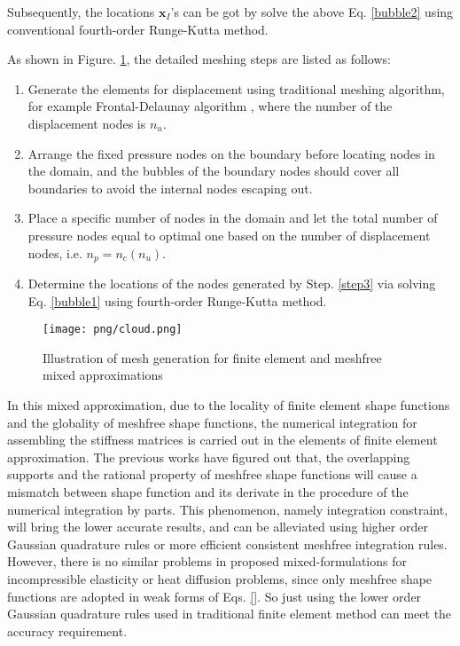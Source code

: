 Subsequently, the locations $\boldsymbol x_I$'s can be got by solve the above Eq. \eqref{bubble2} using conventional fourth-order Runge-Kutta method.

As shown in Figure. \ref{fig:cloud}, the detailed meshing steps are listed as follows: 
\begin{enumerate}
    \item Generate the elements for displacement using traditional meshing algorithm, for example Frontal-Delaunay algorithm , where the number of the displacement nodes is $n_u$. 
    \item Arrange the fixed pressure nodes on the boundary before locating nodes in the domain, and the bubbles of the boundary nodes should cover all boundaries to avoid the internal nodes escaping out.
    \item Place a specific number of nodes in the domain and let the total number of pressure nodes equal to optimal one based on the number of displacement nodes, i.e. $n_p = n_c(n_u)$. \label{step3}
    \item Determine the locations of the nodes generated by Step. \ref{step3} via solving Eq. \eqref{bubble1} using fourth-order Runge-Kutta method.
\end{enumerate}

\begin{figure}[!ht]
\centering
\texttt{[image: png/cloud.png]}
\caption{Illustration of mesh generation for finite element and meshfree mixed approximations}\label{fig:cloud}
\end{figure}

In this mixed approximation, due to the locality of finite element shape functions and the globality of meshfree shape functions, the numerical integration for assembling the stiffness matrices is carried out in the elements of finite element approximation. 
The previous works have figured out that, the overlapping supports and the rational property of meshfree shape functions will cause a mismatch between shape function and its derivate in the procedure of the numerical integration by parts. This phenomenon, namely integration constraint, will bring the lower accurate results, and can be alleviated using higher order Gaussian quadrature rules or more efficient consistent meshfree integration rules. 
However, there is no similar problems in proposed mixed-formulations for incompressible elasticity or heat diffusion problems, since only meshfree shape functions are adopted in weak forms of Eqs. \eqref{}.
So just using the lower order Gaussian quadrature rules used in traditional finite element method can meet the accuracy requirement.
